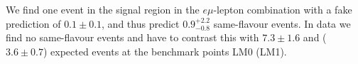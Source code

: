 We find one event in the signal region in the $e\mu$-lepton combination with a fake prediction
of $0.1\pm0.1$, and thus predict $0.9 {}_{-0.8}^{+2.2}$ same-flavour events.
In data we find no same-flavour events and have to contrast this with $7.3\pm1.6$ and ($3.6\pm0.7$) expected
events at the benchmark points LM0 (LM1).



